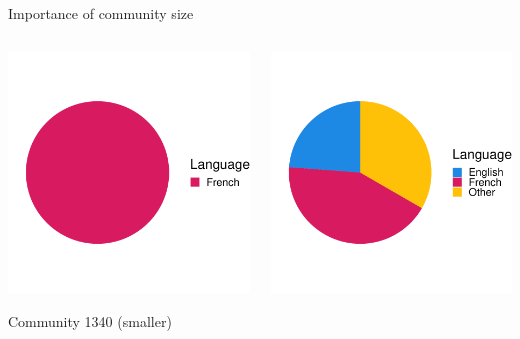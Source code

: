 \documentclass{beamer}\usepackage[]{graphicx}\usepackage[]{color}
\makeatletter
\def\maxwidth{ %
  \ifdim\Gin@nat@width>\linewidth
    \linewidth
  \else
    \Gin@nat@width
  \fi
}
\makeatother
\begin{document}
\begin{frame}
\begin{columns}[t]
\begin{block}{Importance of community size}
\begin{columns}
\begin{center}
\includegraphics[width=\maxwidth]{figure/unnamed-chunk-1-1} 

                Community 1340 (smaller)
              \end{center}
              \begin{center}

\includegraphics[width=\maxwidth]{figure/unnamed-chunk-2-1} 


\end{center}
\end{columns}
\end{block}
\end{columns}
\end{frame}
\end{document}
